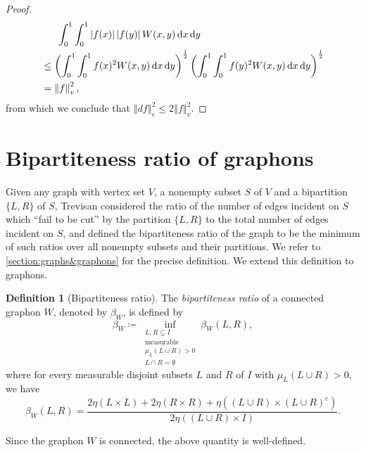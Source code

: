 \documentclass[12pt,a4paper,bold]{thesis}
\theoremstyle{definition}
\newtheorem{defn}[thm]{Definition}
\newcommand*{\abs}[1]{\left\vert #1 \right\vert}
\newcommand*{\norm}[2][]{\left\Vert #2 \right\Vert_{#1}}
\begin{document}
\begin{proof}
    \begin{align*}
        & \hspace{0.56cm} \int_0^1 \int_0^1 \abs{f(x)} \abs{f(y)} W(x,y)\, \mathrm{d}x\, \mathrm{d}y
        \\
        & \leq 
        \left(\int_0^1 \int_0^1 f(x)^2 W(x,y)\, \mathrm{d}x\, \mathrm{d}y\right)^\frac{1}{2} 
        \left(\int_0^1 \int_0^1 f(y)^2 W(x,y)\, \mathrm{d}x\, \mathrm{d}y\right)^\frac{1}{2}
        \\
        & =
        \norm[v]{f}^2,
    \end{align*}
    from which we conclude that $\norm[e]{df}^2 \leq 2 \norm[v]{f}^2$.
\end{proof}

\section{Bipartiteness ratio of graphons} \label{section:bpratio}

Given any graph with vertex set $V$, a nonempty subset $S$ of $V$ and a bipartition
$\{L,R\}$ of $S$, Trevisan considered the ratio of the number of edges incident on $S$ 
which ``fail to be cut'' by the partition $\{L,R\}$ to the total number of edges
incident on $S$, and defined the bipartiteness ratio of the graph to be 
the minimum of such ratios over all nonempty subsets and their partitions. 
We refer to \cref{section:graphs&graphons} for the precise definition.
We extend this definition to graphons.

\begin{defn}[Bipartiteness ratio]
    The \emph{bipartiteness ratio} of a connected graphon $W$, denoted by $\beta_W$,
    is defined by
    \begin{equation*}
        \beta_W \coloneq \inf_{\substack{L,R \subseteq I \\ \text{measurable}\\
        \mu_L(L \cup R) > 0 \\ L \cap R = \emptyset}} \beta_W(L,R),
    \end{equation*}
    where for every measurable disjoint subsets $L$ and $R$ of $I$ 
    with $\mu_L(L \cup R)> 0$, we have
    \begin{equation*}
        \beta_W(L,R) 
        = \frac{2 \eta(L \times L) + 2 \eta(R \times R) + \eta((L \cup R) \times (L \cup R)^c)}
        {2 \eta((L \cup R) \times I)}.
    \end{equation*}
\end{defn}
Since the graphon $W$ is connected, the above quantity is well-defined.
\end{document}
